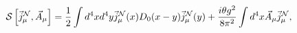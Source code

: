 \begin{equation}
\label{Sini}
{\cal S}\left[\vec j_\mu^{\cal N}, \vec A_\mu\right]=
\frac{1}{2}\int d^4xd^4y\vec j_\mu^{\cal N}(x)
D_0(x-y)\vec j_\mu^{\cal N}(y)+
\frac{i\theta g^2}{8\pi^2}
\int d^4x\vec A_\mu\vec j_\mu^{\cal N},
\end{equation}

